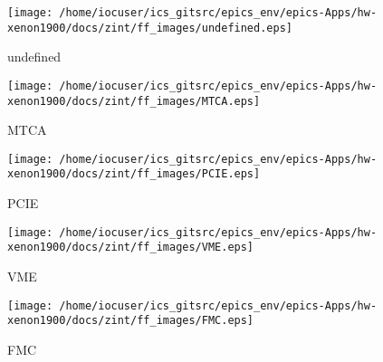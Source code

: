 \noindent
\vspace{1.4cm}
\begin{minipage}{.2\textwidth}
\begin{center}
\texttt{[image: /home/iocuser/ics\_gitsrc/epics\_env/epics-Apps/hw-xenon1900/docs/zint/ff\_images/undefined.eps]}
\end{center}
\end{minipage}
\begin{minipage}{.7\textwidth}
undefined
\end{minipage}


\noindent
\vspace{1.4cm}
\begin{minipage}{.2\textwidth}
\begin{center}
\texttt{[image: /home/iocuser/ics\_gitsrc/epics\_env/epics-Apps/hw-xenon1900/docs/zint/ff\_images/MTCA.eps]}
\end{center}
\end{minipage}
\begin{minipage}{.7\textwidth}
MTCA
\end{minipage}


\noindent
\vspace{1.4cm}
\begin{minipage}{.2\textwidth}
\begin{center}
\texttt{[image: /home/iocuser/ics\_gitsrc/epics\_env/epics-Apps/hw-xenon1900/docs/zint/ff\_images/PCIE.eps]}
\end{center}
\end{minipage}
\begin{minipage}{.7\textwidth}
PCIE
\end{minipage}


\noindent
\vspace{1.4cm}
\begin{minipage}{.2\textwidth}
\begin{center}
\texttt{[image: /home/iocuser/ics\_gitsrc/epics\_env/epics-Apps/hw-xenon1900/docs/zint/ff\_images/VME.eps]}
\end{center}
\end{minipage}
\begin{minipage}{.7\textwidth}
VME
\end{minipage}


\noindent
\vspace{1.4cm}
\begin{minipage}{.2\textwidth}
\begin{center}
\texttt{[image: /home/iocuser/ics\_gitsrc/epics\_env/epics-Apps/hw-xenon1900/docs/zint/ff\_images/FMC.eps]}
\end{center}
\end{minipage}
\begin{minipage}{.7\textwidth}
FMC
\end{minipage}


